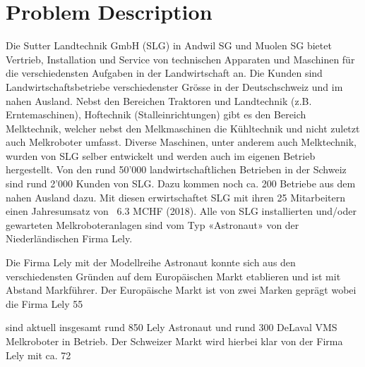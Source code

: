 \section{Problem Description}
Die Sutter Landtechnik GmbH (SLG) in Andwil SG und Muolen SG bietet Vertrieb, Installation und Service von technischen Apparaten und Maschinen für die verschiedensten Aufgaben in der Landwirtschaft an. Die Kunden sind Landwirtschaftsbetriebe verschiedenster Grösse in der Deutschschweiz und im nahen Ausland. Nebst den Bereichen Traktoren und Landtechnik (z.B. Erntemaschinen), Hoftechnik (Stalleinrichtungen) gibt es den Bereich Melktechnik, welcher nebst den Melkmaschinen die Kühltechnik und nicht zuletzt auch Melkroboter umfasst. Diverse Maschinen, unter anderem auch Melktechnik, wurden von SLG selber entwickelt und werden auch im eigenen Betrieb hergestellt. Von den rund 50'000 landwirtschaftlichen Betrieben in der Schweiz sind rund 2’000 Kunden von SLG. Dazu kommen noch ca. 200 Betriebe aus dem nahen Ausland dazu. Mit diesen erwirtschaftet SLG mit ihren 25 Mitarbeitern einen Jahresumsatz von ~6.3 MCHF (2018). Alle von SLG installierten und/oder gewarteten Melkroboteranlagen sind vom Typ «Astronaut» von der Niederländischen Firma Lely.

Die Firma Lely mit der Modellreihe Astronaut konnte sich aus den verschiedensten Gründen auf dem Europäischen Markt etablieren und ist mit Abstand Markführer. Der Europäische Markt ist von zwei Marken geprägt wobei die Firma Lely 55%

sind aktuell insgesamt rund 850 Lely Astronaut und rund 300 DeLaval VMS Melkroboter in Betrieb. Der Schweizer Markt wird hierbei klar von der Firma Lely mit ca. 72%

